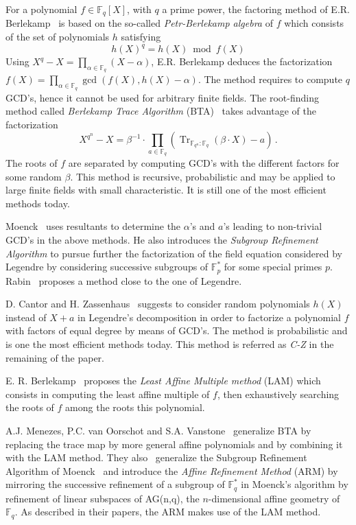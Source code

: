 \documentclass{sig-alternate}
\newcommand{\ff}[1]{\mathbb{F}_{#1}}
\newcommand{\qq}{q}
\newcommand{\nn}{n}
\newcommand{\basef}{\ff{\qq}}
\DeclareMathOperator{\Tr}{Tr}
\newcommand{\tr}[2]{\Tr_{\ff{#1}:\ff{#2}}}
\newcounter{algo}
\begin{document}
For a polynomial $f \in  \mathbb{F}_\qq[X]$, with $\qq$ a prime power, the factoring method of E.R. Berlekamp~\cite{berl67} is based on the so-called \emph{Petr-Berlekamp algebra} of $f$ which consists of the set of polynomials $h$ satisfying  
$$h(X)^q=h(X) \bmod{f(X)}$$
Using 
$X^{\qq}-X=\prod_{\alpha \in \basef}(X-\alpha)$,
E.R. Berlekamp deduces the factorization $f(X)=\prod_{\alpha \in \mathbb{F}_{\qq}} \gcd(f(X),h(X)-\alpha)$. The method %
requires to compute $\qq$ GCD's, hence it cannot be used for arbitrary finite fields. The root-finding method called \emph{Berlekamp Trace Algorithm} (BTA)~\cite{berl70} takes advantage of the factorization 
$$X^{\qq^n}-X=\beta^{-1} \cdot \prod_{a \in \basef}(\tr{\qq^n}{\qq}(\beta \cdot X)-a)\,.$$
The roots of $f$ are separated by computing GCD's with the different factors for some random $\beta$. This method is recursive, probabilistic and may be applied to large finite fields with small characteristic. It is still one of the most efficient methods today.

Moenck~\cite{Moenck77} uses resultants to determine the $\alpha$'s and $a$'s leading to non-trivial GCD's in the above methods. He also introduces the \emph{Subgroup Refinement Algorithm} to pursue further the factorization of the field equation considered by Legendre by considering successive subgroups of $\mathbb{F}_{p}^\ast$ for some special primes $p$.
Rabin~\cite{Rabin79} proposes a method close to the one of Legendre. 

D. Cantor and H. Zassenhaus~\cite{cantor1981} suggests to consider random polynomials $h(X)$ instead of $X+a$ in Legendre's decomposition in order to factorize a polynomial $f$ with factors of equal degree by means of GCD's. The method is probabilistic and is one the most efficient methods today. This method is referred as \emph{C-Z} in the remaining of the paper.

E. R. Berlekamp~\cite{mBER84a} proposes the \emph{Least Affine Multiple method} (LAM) which consists in computing the least affine multiple of $f$, then exhaustively searching the roots of $f$ among the roots this polynomial. 

A.J. Menezes, P.C. van Oorschot and S.A. Vanstone~\cite{MenezesOV88,OorschotV89} generalize BTA by replacing the trace map by more general affine polynomials and by combining it with the LAM method. They also~\cite{Menvanovans92} generalize the Subgroup Refinement Algorithm of Moenck~\cite{Moenck77} and 
introduce the \emph{Affine Refinement Method} (ARM) by mirroring the successive refinement of a subgroup of $\mathbb{F}_{\qq}^\ast$ in Moenck's algorithm 
by refinement of linear subspaces of AG(\nn,\qq), the $\nn$-dimensional affine geometry of $\mathbb{F}_{\qq}$. %
As described in their papers, the ARM makes use of the LAM method.
\end{document}
